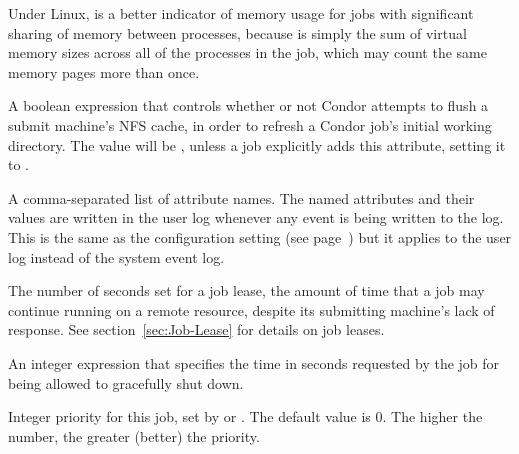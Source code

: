 \begin{description}
Under Linux,  is a better indicator of
memory usage for jobs with significant sharing of memory between
processes, because  is simply the sum of virtual
memory sizes across all of the processes in the job, which may count
the same memory pages more than once.

\label{IwdFlushNFSCache-job-attribute}
\item[\AdAttr{IwdFlushNFSCache}:]  A boolean expression that controls
whether or not Condor attempts to flush a submit machine's NFS cache,
in order to refresh a Condor job's initial working directory.
The value will be , unless a job explicitly adds this
attribute, setting it to .

\label{JobAdInformationAttrs-job-attribute}
\item[\AdAttr{JobAdInformationAttrs}:] A comma-separated list
of attribute names.  The named attributes and their values are written
in the user log whenever any event is being written to the log.
This is the same as the configuration setting
 (see
page~\pageref{param:EventLogJobAdInformationAttrs}) but it applies to
the user log instead of the system event log.


\item[\AdAttr{JobLeaseDuration}:]  The number of seconds set for
a job lease, the amount of time that a job may continue running
on a remote resource,
despite its submitting machine's lack of response.
See section~\ref{sec:Job-Lease} for details on job leases.

\item[\AdAttr{JobMaxVacateTime}:] An integer expression that specifies
the time in seconds requested by the job for being allowed to
gracefully shut down.

\item[\AdAttr{JobPrio}:]  Integer priority for this job, set by
 or .  The default value is 0.  The higher
the number, the greater (better) the priority.


\end{description}
